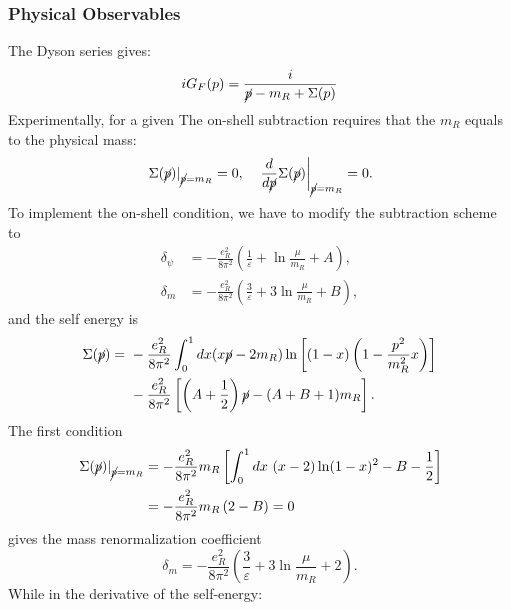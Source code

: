 \subsubsection{Physical Observables}

The Dyson series gives:
\begin{equation}
	iG_F(p) = \frac{i}{\cancel p - m_R + \Sigma(p)}
\end{equation}
Experimentally, for a given 
The on-shell subtraction requires that the $m_R$ equals to the physical mass:
\begin{equation}
	\left. \Sigma(\cancel p) \right|_{\cancel p=m_R} = 0, \quad 
	\left. \frac{d}{d \cancel p}\Sigma(\cancel p) \right|_{\cancel p=m_R} = 0.
\end{equation}
To implement the on-shell condition, we have to modify the subtraction scheme to
\begin{equation}
\begin{aligned}
	\delta_{\psi} &= -\frac{e_R^2}{8\pi^2}\left(\frac{1}{\varepsilon}+\ln\frac{\mu}{m_R} +A\right), \\
	\delta_m &= -\frac{e_R^2}{8\pi^2}\left(\frac{3}{\varepsilon} + 3\ln\frac{\mu}{m_R} + B\right),
\end{aligned}
\end{equation}
and the self energy is
\begin{equation}
\begin{aligned}
	\Sigma(\cancel p)
	=&\ -\frac{e_R^2}{8\pi^2} \int_0^1 dx(x\cancel{p}-2m_R)\ln\left[(1-x)\left(1- \frac{p^2}{m_R^2} x \right)\right]\\
	&\  -\frac{e_R^2}{8\pi^2} \left[\left(A+\frac{1}{2}\right)\cancel p - (A+B+1)m_R\right].
\end{aligned}
\end{equation}
The first condition
\begin{equation}
\begin{aligned}
	\left. \Sigma(\cancel p) \right|_{\cancel p=m_R}
	&= -\frac{e_R^2}{8\pi^2} m_R \left[\int_0^1 dx\ (x-2) \ln(1-x)^2 - B-\frac{1}{2}\right] \\
	&= -\frac{e_R^2}{8\pi^2} m_R \left(2 - B\right) = 0
\end{aligned}
\end{equation}
gives the mass renormalization coefficient
\begin{equation}
	\delta_m = -\frac{e_R^2}{8\pi^2}\left(\frac{3}{\varepsilon} + 3\ln\frac{\mu}{m_R} + 2\right).
\end{equation}
While in the derivative of the self-energy:
